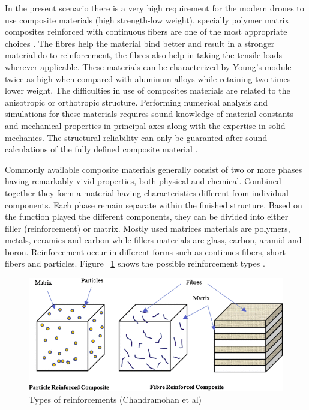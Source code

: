 \documentclass{article}
\begin{document}
In the present scenario there is a very high requirement for the modern drones  to use composite materials (high strength-low weight), specially polymer matrix composites reinforced with continuous fibers are one of the most  appropriate choices \citep{kassapoglou}. The fibres help the material bind better and result in a stronger material do to reinforcement, the fibres also help in taking the tensile loads wherever applicable. These materials can be  characterized by Young's module twice as high when compared with aluminum alloys while retaining two times lower weight. The difficulties in use of composites materials are related to the anisotropic or orthotropic structure. Performing numerical analysis and simulations for these materials requires sound knowledge of material constants and mechanical properties in principal axes along with the expertise in solid mechanics. The structural reliability can only be guaranted after sound calculations of the fully defined composite material \citep{chung}.

Commonly available composite materials generally consist of two or more phases having remarkably vivid properties, both physical and chemical. Combined together they form a material having characteristics different from individual components. Each phase remain separate within the finished structure. Based on the function played the different components, they can be divided into either filler (reinforcement) or  matrix. Mostly used matrices materials are polymers, metals, ceramics and carbon while fillers materials are glass, carbon, aramid and boron. Reinforcement occur in different forms such as continues fibers, short fibers and particles. Figure ~\ref{fig:binding}  shows the possible reinforcement types  \citep{Chandramohan2018}.

\begin{figure}[h!]
\centering
\includegraphics[scale=0.5]{binding.png}
\caption{ Types of reinforcements (Chandramohan et al)}
\label{fig:binding}
\end{figure}
\end{document}
